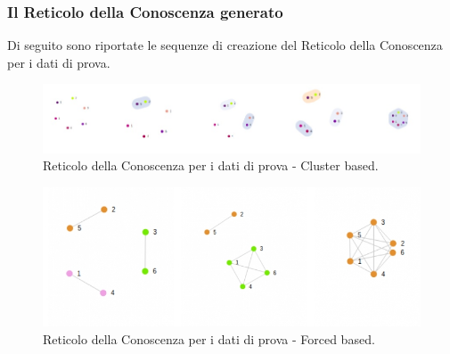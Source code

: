 \subsubsection{Il Reticolo della Conoscenza generato}
\label{Il Reticolo della Conoscenza generato}

Di seguito sono riportate le sequenze di creazione del Reticolo della Conoscenza per i dati di prova.
\noindent

\begin{figure}[H]
\centering
	\includegraphics[width=1.20\linewidth]{./image/collage_reticolo-general-cluster.png}
	\caption{Reticolo della Conoscenza per i dati di prova - Cluster based.}
	\label{Reticolo della Conoscenza per i dati di prova - Cluster based.}
\end{figure}
\noindent

\begin{figure}[H]
\centering
	\includegraphics[width=1\linewidth]{./image/collage_reticolo-general-forced.png}
	\caption{Reticolo della Conoscenza per i dati di prova - Forced based.}
	\label{Reticolo della Conoscenza per i dati di prova - Forced based.}
\end{figure}
\noindent

